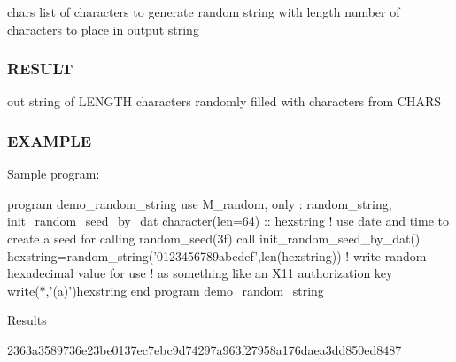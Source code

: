 chars list of characters to generate random string with length number of characters to place in output string

\subsubsection*{R\+E\+S\+U\+LT}

out string of L\+E\+N\+G\+TH characters randomly filled with characters from C\+H\+A\+RS

\subsubsection*{E\+X\+A\+M\+P\+LE}

\begin{DoxyVerb}Sample program:

 program demo_random_string
 use M_random, only : random_string, init_random_seed_by_dat
    character(len=64) :: hexstring
    ! use date and time to create a seed for calling random_seed(3f)
    call init_random_seed_by_dat()
    hexstring=random_string('0123456789abcdef',len(hexstring))
    ! write random hexadecimal value for use
    ! as something like an X11 authorization key
    write(*,'(a)')hexstring
 end program demo_random_string

Results

 2363a3589736e23be0137ec7ebc9d74297a963f27958a176daea3dd850ed8487 \end{DoxyVerb}
 